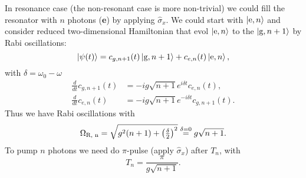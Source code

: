 In resonance case (the non-resonant case is more non-trivial) we could fill the resonator with $n$ photons (\textbf{e}) by applying $\hat{\sigma}_x$. We could start with $\left| \text{e}, n \right\rangle$  and consider reduced two-dimensional Hamiltonian that evol $\left| \text{e}, n \right\rangle$ to the $\left| \text{g}, n+1 \right\rangle$ by Rabi oscillations:
\begin{equation*}
	\left| \psi(t) \right\rangle =  c_{g, n+1}(t) \left| \text{g}, n+1 \right\rangle + c_{e, n}(t) \left| \text{e}, n \right\rangle,
\end{equation*}
with $\delta = \omega_0 - \omega$
\begin{align*}
	\tfrac{d }{d t} c_{g, n+1}(t) &= - i g \sqrt{n+1} e^{i \delta t} c_{e, n}(t),\\
	    \tfrac{d }{d t} c_{e, n}(t) &= - i g \sqrt{n+1} e^{-i \delta t} c_{g, n+1}(t).
\end{align*}
Thus we have Rabi oscillations with
\begin{equation*}
	\Omega_{\textnormal{R, n}} = \sqrt{g^2 (n+1) + \left(\tfrac{\delta}{2}\right)^2} \overset{\delta=0}{=} g \sqrt{n+1}.
\end{equation*}
To pump $n$ photons we need do $\pi$-pulse (apply $\hat{\sigma}_x$) after $T_n$, with
\begin{equation*}
	T_n = \frac{\pi}{g \sqrt{n+1}}.
\end{equation*}
